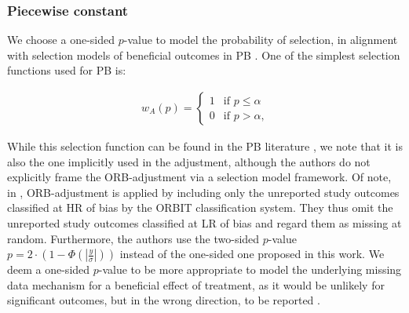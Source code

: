 \documentclass[twocolumn]{article}\usepackage[]{graphicx}\usepackage[]{xcolor}
\newcommand{\abs}[1]{\left\lvert#1\right\rvert} %
\begin{document}
\subsubsection{Piecewise constant}

We choose a one-sided $p$-value to model the probability of selection, in alignment with selection models of beneficial outcomes in PB \citep{HedgesVev, reviewselection, selectionCont}. One of the simplest selection functions used for PB is:


\begin{equation}
\begin{aligned}
\label{sel0}
w_A(p)= \begin{cases} 1 & \text{if } p \leq \alpha  \\
0 & \text{if } p > \alpha \text{,} \end{cases}
\end{aligned}
\end{equation}



While this selection function can be found in the PB literature \citep{selection0, selection1, reviewselection}, we note that it is also the one implicitly used in the \citet{Copas2019} adjustment, although the authors do not explicitly frame the ORB-adjustment via a selection model framework. Of note, in \citet{Copas2019}, ORB-adjustment is applied by including only the unreported study outcomes classified at HR of bias by the ORBIT classification system. They thus omit the unreported study outcomes classified at LR of bias and regard them as missing at random. Furthermore, the authors use the two-sided $p$-value $p = 2 \cdot (1 - \Phi(\abs{\frac{y}{\sigma}}))$ instead of the one-sided one proposed in this work. We deem a one-sided $p$-value to be more appropriate to model the underlying missing data mechanism for a beneficial effect of treatment, as it would be unlikely for significant outcomes, but in the wrong direction, to be reported \citep{HedgesVev, reviewselection, selectionCont}. 

\end{document}
